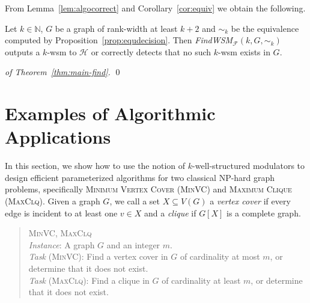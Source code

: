 \documentclass{llncs}
\newcommand{\Nat}{\mathbb{N}}
\newcommand{\FF}{\mathcal{F}}
\def\HH{{\mathcal H}}
\def\wsm{well-structured modulator}
\begin{document}
{From Lemma~\ref{lem:algocorrect} and Corollary~\ref{cor:equiv} we obtain the following.
 
\begin{corollary}
\label{cor:algocorrect}
Let $k\in \Nat$, $G$ be a graph of rank-width at least $k+2$ and $\sim_k$ be the equivalence computed by Proposition~\ref{prop:equdecision}. Then
\emph{FindWSM}$_\FF(k,G,\sim_k)$ outputs a $k$-wsm{} to $\HH$ or correctly detects that no such $k$-wsm exists in $G$.
\end{corollary}}

\lv{\algo}

\begin{proof}[of Theorem~\ref{thm:main-find}]
\qed
\end{proof}





\section{Examples of Algorithmic Applications}
\label{sec:examples}

In this section, we show how to use the notion of $k$-\wsm s to design efficient parameterized algorithms for two classical NP-hard graph problems, specifically \textsc{Minimum Vertex Cover (MinVC)} and \textsc{Maximum Clique (MaxClq)}. Given a graph $G$, we call a set $X\subseteq V(G)$ a \emph{vertex cover} if every edge is incident to at least one $v\in X$ and a \emph{clique} if $G[X]$ is a complete graph.

\vspace{-.5cm}
\begin{center}
  \begin{boxedminipage}[t]{0.99\textwidth}
\begin{quote}
\smallskip
  \textsc{MinVC, MaxClq}\\ \nopagebreak
\emph{Instance}: A graph $G$ and an integer $m$.\\ \nopagebreak
  \emph{Task} (\textsc{MinVC}): Find a vertex cover in $G$ of cardinality at most $m$, or determine that it does not exist. \\
\emph{Task} (\textsc{MaxClq}): Find a clique in $G$ of cardinality at least $m$, or determine that it does not exist. \smallskip
\end{quote}
\end{boxedminipage}
\end{center}
\end{document}
